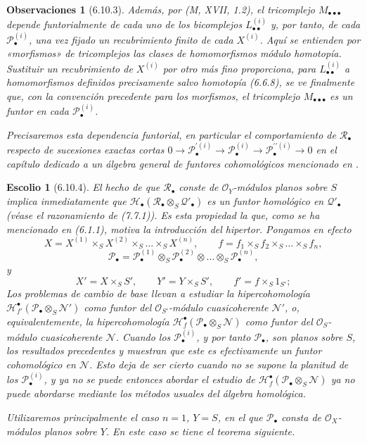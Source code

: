 \documentclass[10pt,oneside,openany]{book}
\theoremstyle{egaenv}\newtheorem*{env}{---}
\theoremstyle{egastatement}
\theoremstyle{egadescription}
\newtheorem*{remarks}{Observaciones}
\newtheorem*{scholium}{Escolio}
\begin{document}
\begin{remarks}[6.10.3]
Además, por (M, XVII, 1.2), el tricomplejo
$M_{\bullet\bullet\bullet}$ depende \emph{funtorialmente} de cada uno de
los bicomplejos $L_{\bullet\bullet}^{(i)}$ y, por tanto, de cada
$\mathscr P_\bullet^{(i)}$, una vez fijado un recubrimiento finito de
cada $X^{(i)}$. Aquí se entienden por «morfismos» de tricomplejos
las \emph{clases de homomorfismos} módulo homotopía. Sustituir un
recubrimiento de $X^{(i)}$ por otro más fino proporciona, para
$L_{\bullet\bullet}^{(i)}$ a homomorfismos definidos precisamente salvo homotopía (6.6.8), se ve finalmente que, con la convención precedente para los morfismos, el tricomplejo $M_{\bullet\bullet\bullet}$ es un \emph{funtor} en
cada $\mathscr P_\bullet^{(i)}$.

Precisaremos esta dependencia funtorial, en particular el
comportamiento de $\mathscr R_\bullet$ respecto de sucesiones exactas
cortas
$0\longrightarrow\mathscr P_\bullet^{\prime(i)}\longrightarrow\mathscr P_\bullet^{(i)}\longrightarrow\mathscr P_\bullet^{\prime\prime(i)}\longrightarrow0$
en el capítulo dedicado a un álgebra general de funtores
cohomológicos mencionado en .
\end{remarks}

\begin{scholium}[6.10.4]
\label{III.6.10.4}
El hecho de que $\mathscr R_\bullet$ conste de $\mathscr O_Y$-módulos
\emph{planos} sobre $S$ implica inmediatamente que
$\mathscr H_\bullet(\mathscr R_\bullet\otimes_S\mathscr Q'_\bullet)$
es un funtor \emph{homológico} en $\mathscr Q'_\bullet$ (véase el razonamiento de (7.7.1)). Es esta propiedad la que, como se ha mencionado en (6.1.1), motiva la introducción del hipertor. Pongamos en efecto \[
  X=X^{(1)}\times_SX^{(2)}\times_S\ldots\times_SX^{(n)},
  \qquad
  f=f_1\times_Sf_2\times_S\ldots\times_Sf_n,
\]
\[
  \mathscr P_\bullet
  =
  \mathscr P_\bullet^{(1)}
  \otimes_S\mathscr P_\bullet^{(2)}
  \otimes\ldots\otimes_S\mathscr P_\bullet^{(n)},
\]
y
\[
  X'=X\times_SS',
  \qquad
  Y'=Y\times_SS',
  \qquad
  f'=f\times_S1_{S'};
\]
Los problemas de cambio de base llevan a estudiar la
hipercohomología
$\mathscr H^\bullet_{f'}(\mathscr P_\bullet\otimes_S\mathscr N')$
como funtor del $\mathscr O_{S'}$-módulo cuasicoherente $\mathscr N'$, o,
equivalentemente, la hipercohomología
$\mathscr H^\bullet_f(\mathscr P_\bullet\otimes_S\mathscr N)$
como funtor del $\mathscr O_S$-módulo cuasicoherente $\mathscr N$. Cuando
los $\mathscr P_\bullet^{(i)}$, y por tanto $\mathscr P_\bullet$, son
\emph{planos} sobre $S$, los resultados precedentes y
 muestran que este es efectivamente un funtor
\emph{cohomológico} en $\mathscr N$. Esto deja de ser cierto cuando no se
supone la planitud de los $\mathscr P_\bullet^{(i)}$, y ya no se puede entonces abordar el estudio de $\mathscr H^\bullet_f(\mathscr P_\bullet\otimes_S\mathscr N)$
ya no puede abordarse mediante los métodos usuales del álgebra
homológica.

Utilizaremos principalmente el caso $n=1$, $Y=S$, en el que
$\mathscr P_\bullet$ consta de $\mathscr O_X$-módulos \emph{planos} sobre $Y$.
En este caso se tiene el teorema siguiente.
\end{scholium}
\end{document}
